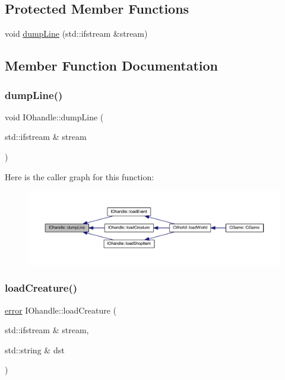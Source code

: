 \subsection*{Protected Member Functions}
\begin{DoxyCompactItemize}
\item 
void \mbox{\hyperlink{class_i_ohandle_a7803f3ab80542103759f56aee5f72dfe}{dump\+Line}} (std\+::ifstream \&stream)
\end{DoxyCompactItemize}


\subsection{Member Function Documentation}
\mbox{\label{class_i_ohandle_a7803f3ab80542103759f56aee5f72dfe}} 
\subsubsection{\texorpdfstring{dump\+Line()}{dumpLine()}}
{\footnotesize\ttfamily void I\+Ohandle\+::dump\+Line (\begin{DoxyParamCaption}\item[{std\+::ifstream \&}]{stream }\end{DoxyParamCaption})\hspace{0.3cm}{\ttfamily [protected]}}

Here is the caller graph for this function\+:\nopagebreak
\begin{figure}[H]
\begin{center}
\leavevmode
\includegraphics[width=350pt]{class_i_ohandle_a7803f3ab80542103759f56aee5f72dfe_icgraph}
\end{center}
\end{figure}
\mbox{\label{class_i_ohandle_a99dd11dfe48cea80e164a9d7477aad5f}} 
\subsubsection{\texorpdfstring{load\+Creature()}{loadCreature()}}
{\footnotesize\ttfamily \mbox{\hyperlink{_errors_list_8h_af10dacfa214e2575bb2e0ee407c242e0}{error}} I\+Ohandle\+::load\+Creature (\begin{DoxyParamCaption}\item[{std\+::ifstream \&}]{stream,  }\item[{std\+::string \&}]{dst }\end{DoxyParamCaption})}


